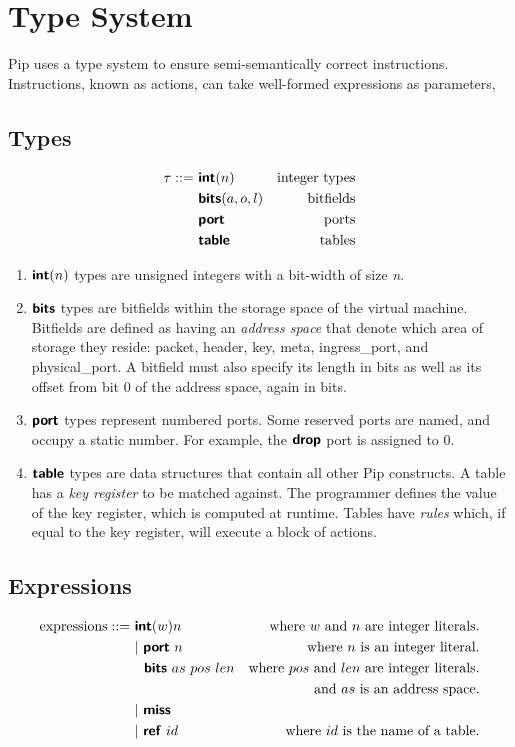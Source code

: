 
\section{Type System}
Pip uses a type system to ensure semi-semantically correct instructions. Instructions, known as actions, can take well-formed expressions as parameters, 

\subsection{Types}

\begin{align*}
\tau ::=~& \bm{\mathsf{{int}}}(n)        & \text{integer types} \\
         & \bm{\mathsf{{bits}}}(a, o, l) & \text{bitfields} \\
         & \bm{\mathsf{{port}}}          & \text{ports} \\
         & \bm{\mathsf{{table}}}         & \text{tables} \\
\end{align*}

\begin{enumerate}
\item $\bm{\mathsf{{int}}}(n)$ types are unsigned integers with a bit-width of size \textit{n}.
\item $\bm{\mathsf{{bits}}}$ types are bitfields within the storage space of the virtual machine. Bitfields are defined as having an \textit{address space} that denote which area of storage they reside: packet, header, key, meta, ingress\_port, and physical\_port. A bitfield must also specify its length in bits as well as its offset from bit 0 of the address space, again in bits.
\item $\bm{\mathsf{{port}}}$ types represent numbered ports. Some reserved ports are named, and occupy a static number. For example, the $\bm{\mathsf{{drop}}}$ port is assigned to 0.
\item $\bm{\mathsf{{table}}}$ types are data structures that contain all other Pip constructs. A table has a \textit{key register} to be matched against. The programmer defines the value of the key register, which is computed at runtime. Tables have \textit{rules} which, if equal to the key register, will execute a block of actions.
\end{enumerate}

\subsection{Expressions}
\begin{align*}
  \text{expressions} ::=~& \mathct{int}(w) n    & \text{where} \ w \ \text{and} \ n \ \text{are integer literals.}\\
  & | \ \mathct{port} \ n   & \text{where } n \text{ is an integer literal.}\\
  & \ \ \mathct{bits} \ as \ pos \ len &\text{where } pos \text{ and } len \text{ are integer literals.} \\ & &\text{and } as \text{ is an address space.}\\
  & | \ \mathct{miss}\\
  & | \ \mathct{ref} \ id    &\text{where } id \text{ is the name of a table.}
\end{align*}
